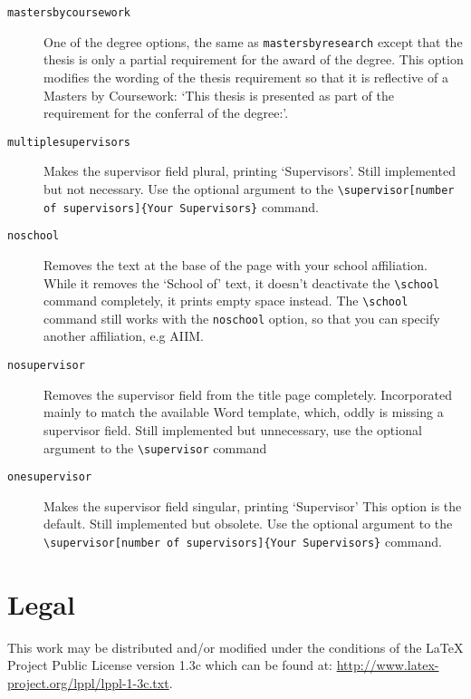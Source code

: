 \documentclass[12pt,oneside]{article}
\newcommand{\option}[1]{\texttt{\color{Green}#1}} %
\newcommand{\command}[1]{\texttt{\color{Red}#1}} %
\newcommand{\comoptions}[1]{\texttt{\color{Blue}#1}} %
\begin{document}
\begin{description}
    \item[\option{mastersbycoursework}]
    One of the degree options, the same as \option{mastersbyresearch} except that the thesis is only a partial requirement for the award of the degree. This option modifies the wording of the thesis requirement so that it is reflective of a Masters by Coursework: `This thesis is presented as part of the requirement for the conferral of the degree:'.
    
    \item[\option{multiplesupervisors}]
    Makes the supervisor field plural, printing `Supervisors'. Still implemented but not necessary. Use the optional argument to the \command{\textbackslash{}supervisor}\option{[number of supervisors]}\comoptions{\{Your Supervisors\}} command.
    
    \item[\option{noschool}]
    Removes the text at the base of the page with your school affiliation. While it removes the `School of' text, it doesn't deactivate the \command{\textbackslash{}school} command completely, it prints empty space instead. The \command{\textbackslash{}school} command still works with the \option{noschool} option, so that you can specify another affiliation, e.g AIIM.
    
    \item[\option{nosupervisor}]
    Removes the supervisor field from the title page completely. Incorporated mainly to match the available Word template, which, oddly is missing a supervisor field. Still implemented but unnecessary, use the optional argument to the \command{\textbackslash{}supervisor} command
    
    \item[\option{onesupervisor}]
    Makes the supervisor field singular, printing `Supervisor' This option is the default. Still implemented but obsolete. Use the optional argument to the \command{\textbackslash{}supervisor}\option{[number of supervisors]}\comoptions{\{Your Supervisors\}} command.
    
\end{description}

\section{Legal}
This work may be distributed and/or modified under the conditions of the LaTeX Project Public License version 1.3c which can be found at: \url{http://www.latex-project.org/lppl/lppl-1-3c.txt}.
\end{document}
